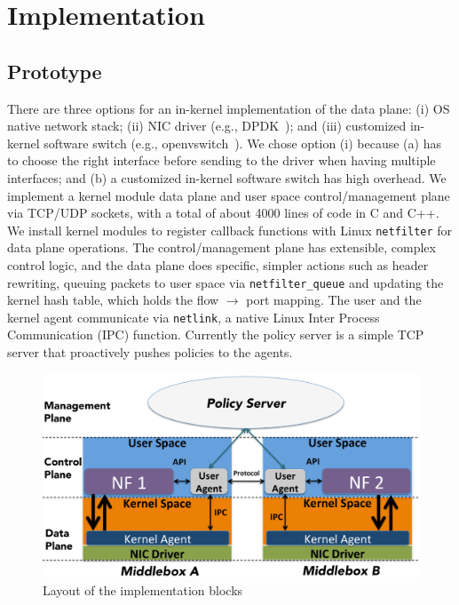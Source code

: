 \section {Implementation}

\subsection{Prototype}

There are    three  options   for  an in-kernel
implementation of the data plane: (i) OS  native  network stack; (ii) NIC
driver (e.g.,  DPDK~\cite{dpdk});   and  (iii)   customized  in-kernel
software switch (e.g.,  openvswitch~\cite{ovs}).  We chose option (i) because (a) \system has  to choose the  right interface before sending to
the driver   when  having  multiple  interfaces;  and  (b)  a customized
in-kernel software switch has high overhead.  We implement  a kernel module data  plane  and user  space control/management
plane via TCP/UDP sockets, with a total of about 4000 lines of code in
C  and   C++.   We install kernel modules to
register callback  functions with  Linux  \texttt{netfilter}  for data
plane operations. The   control/management  plane  has    extensible,
complex control logic, and the data plane does specific, simpler actions
such as header rewriting, queuing packets to user  space via \texttt{netfilter\_queue} and  updating the
kernel hash table, which holds the flow $\rightarrow$ port mapping.  The user and the kernel  agent  communicate via 
\texttt{netlink}, a native   Linux  Inter Process Communication  (IPC)
function.  Currently the policy server  is   a simple TCP server  that
proactively pushes policies to the agents.

\begin{figure}[ht]
\centering
\includegraphics[width=\linewidth]{figures/archiIllustrrate.pdf} 

\caption{\small Layout of the implementation blocks}\label{netf}
\end{figure}





